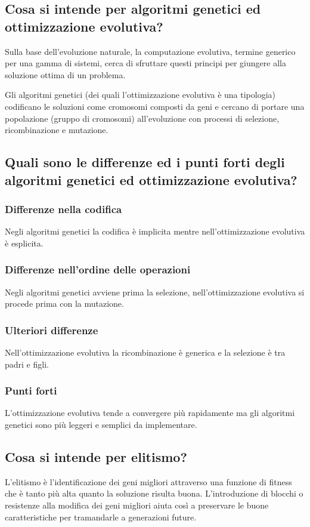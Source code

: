\documentclass[\main/main.tex]{subfiles}
\begin{document}
\subsection{Cosa si intende per algoritmi genetici ed ottimizzazione evolutiva?}
Sulla base dell'evoluzione naturale, la computazione evolutiva, termine generico per una gamma di sistemi, cerca di sfruttare questi principi per giungere alla soluzione ottima di un problema.

Gli algoritmi genetici (dei quali l'ottimizzazione evolutiva è una tipologia) codificano le soluzioni come cromosomi composti da geni e cercano di portare una popolazione (gruppo di cromosomi) all'evoluzione con processi di selezione, ricombinazione e mutazione.

\subsection{Quali sono le differenze ed i punti forti degli algoritmi genetici ed ottimizzazione evolutiva?}
\subsubsection*{Differenze nella codifica}
Negli algoritmi genetici la codifica è implicita mentre nell'ottimizzazione evolutiva è esplicita.

\subsubsection*{Differenze nell'ordine delle operazioni}
Negli algoritmi genetici avviene prima la selezione, nell'ottimizzazione evolutiva si procede prima con la mutazione.

\subsubsection*{Ulteriori differenze}
Nell'ottimizzazione evolutiva la ricombinazione è generica e la selezione è tra padri e figli.

\subsubsection*{Punti forti}
L'ottimizzazione evolutiva tende a convergere più rapidamente ma gli algoritmi genetici sono più leggeri e semplici da implementare.

\subsection{Cosa si intende per elitismo?}
L'elitismo è l'identificazione dei geni migliori attraverso una funzione di fitness che è tanto più alta quanto la soluzione risulta buona. L'introduzione di blocchi o resistenze alla modifica dei geni migliori aiuta così a preservare le buone caratteristiche per tramandarle a generazioni future.
\end{document}
